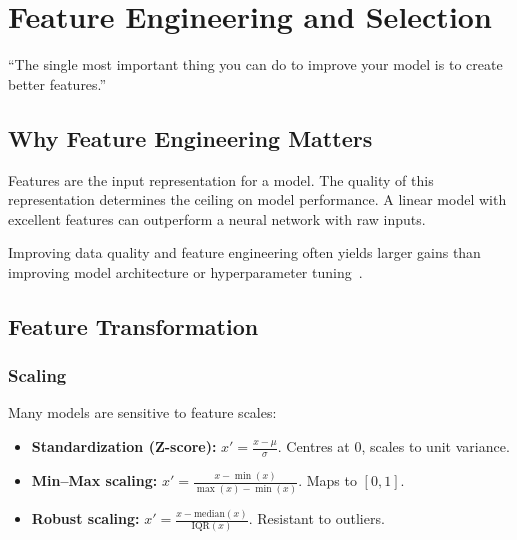 \chapter{Feature Engineering and Selection}
\label{ch:feature-engineering}

\epigraph{``The single most important thing you can do to improve your model is to create better features.''}{}


\section{Why Feature Engineering Matters}

Features are the input representation for a model. The quality of this representation determines the ceiling on model performance. A linear model with excellent features can outperform a neural network with raw inputs.

\begin{principle}
	Improving data quality and feature engineering often yields larger gains than improving model architecture or hyperparameter tuning~\cite{ng2024machine}.
\end{principle}

\section{Feature Transformation}

\subsection{Scaling}

Many models are sensitive to feature scales:

\begin{itemize}
	\item \textbf{Standardization (Z-score):} $x' = \frac{x - \mu}{\sigma}$. Centres at 0, scales to unit variance.
	\item \textbf{Min--Max scaling:} $x' = \frac{x - \min(x)}{\max(x) - \min(x)}$. Maps to $[0, 1]$.
	\item \textbf{Robust scaling:} $x' = \frac{x - \text{median}(x)}{\text{IQR}(x)}$. Resistant to outliers.
\end{itemize}

